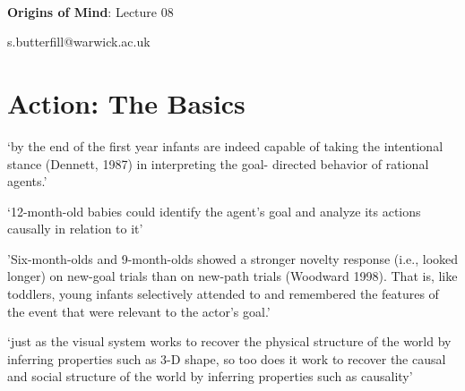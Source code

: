 \documentclass[12pt]{extarticle}
\date{}
\makeatletter
\def \ititle {Origins of Mind}
\def \isubtitle {Lecture 08}
\def \iemail{s.butterfill@warwick.ac.uk}
\makeatother
\begin{document}
\begin{multicols}{3}

\setlength\footnotesep{1em}








\def \ititle {Origins of Mind}
 
\def \isubtitle {Lecture 08}
 
 
 
\
 
 
 
\begin{center}
 
{\Large
 
\textbf{\ititle}: \isubtitle
 
}
 
 
 
\iemail %
 
\end{center}
 
 
 
\section{Action: The Basics}
 
‘by the end of the first year infants are indeed capable of taking the intentional stance (Dennett, 1987) in interpreting the goal- directed behavior of rational agents.’
\citep[p.\ 184]{Gergely:1995sq}
 
‘12-month-old babies could identify the agent’s goal and analyze its actions causally in relation to it’
\citep[p.\ 190]{Gergely:1995sq}
 
'Six-month-olds and 9-month-olds showed a stronger novelty response (i.e., looked longer) on new-goal trials than on new-path trials (Woodward 1998). That is, like toddlers, young infants selectively attended to and remembered the features of the event that were relevant to the actor’s goal.'
\citep[p.\ 153]{woodward:2001_making}
 
‘just as the visual system works to recover the physical structure of the world by inferring properties such as 3-D shape, so too does it work to recover the causal and social structure of the world by inferring properties such as causality’
\citep[p.\ 299]{Scholl:2000eq}
 

\end{multicols}
\end{document}
